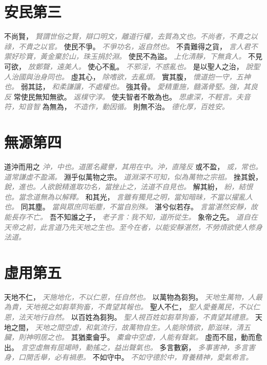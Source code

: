 \documentclass[a4paper,zihao=-4,oneside,landscape,UTF8]{ctexart}
\newcommand{\zhushi}[1]{\scriptsize{\textit{\textcolor{gray}{#1}}}\normalsize}
\begin{document}
\section{安民第三}

不尚賢，
\zhushi{賢謂世俗之賢，辯口明文，離道行權，去質為文也。不尚者，不貴之以祿，不貴之以官。}
使民不爭。
\zhushi{不爭功名，返自然也。}
不貴難得之貨，
\zhushi{言人君不禦好珍寶，黃金棄於山，珠玉捐於淵。}
使民不為盜。
\zhushi{上化清靜，下無貪人。}
不見可欲，
\zhushi{放鄭聲，遠美人。}
使心不亂。
\zhushi{不邪淫，不惑亂也。}
是以聖人之治，
\zhushi{說聖人治國與治身同也。}
虛其心，
\zhushi{除嗜欲，去亂煩。}
實其腹，
\zhushi{懷道抱一守，五神也。}
弱其誌，
\zhushi{和柔謙讓，不處權也。}
強其骨。
\zhushi{愛精重施，髓滿骨堅。強，其良反}
常使民無知無欲。
\zhushi{返樸守淳。}
使夫智者不敢為也。
\zhushi{思慮深，不輕言。夫音符，知音智}
為無為，
\zhushi{不造作，動因循。}
則無不治。
\zhushi{德化厚，百姓安。}


\section{無源第四}

道沖而用之
\zhushi{沖，中也。道匿名藏譽，其用在中。沖，直隆反}
或不盈，
\zhushi{或，常也。道常謙虛不盈滿。}
淵乎似萬物之宗。
\zhushi{道淵深不可知，似為萬物之宗祖。}
挫其銳，
\zhushi{銳，進也。人欲銳精進取功名，當挫止之，法道不自見也。}
解其紛，
\zhushi{紛，結恨也。當念道無為以解釋。}
和其光，
\zhushi{言雖有獨見之明，當知暗昧，不當以擢亂人也。}
同其塵。
\zhushi{當與眾庶同垢塵，不當自別殊。}
湛兮似若存。
\zhushi{言當湛然安靜，故能長存不亡。}
吾不知誰之子，
\zhushi{老子言：我不知，道所從生。}
象帝之先。
\zhushi{道自在天帝之前，此言道乃先天地之生也。至今在者，以能安靜湛然，不勞煩欲使人修身法道。}


\section{虛用第五}

天地不仁，
\zhushi{天施地化，不以仁恩，任自然也。}
以萬物為芻狗。
\zhushi{天地生萬物，人最為貴，天地視之如芻草狗畜，不貴望其報也。}
聖人不仁，
\zhushi{聖人愛養萬民，不以仁恩，法天地行自然。}
以百姓為芻狗。
\zhushi{聖人視百姓如芻草狗畜，不貴望其禮意。}
天地之間，
\zhushi{天地之間空虛，和氣流行，故萬物自生。人能除情欲，節滋味，清五臟，則神明居之也。}
其猶橐龠乎。
\zhushi{橐龠中空虛，人能有聲氣。}
虛而不屈，動而愈出。
\zhushi{言空虛無有屈竭時，動搖之，益出聲氣也。}
多言數窮，
\zhushi{多事害神，多言害身，口開舌舉，必有禍患。}
不如守中。
\zhushi{不如守德於中，育養精神，愛氣希言。}
\end{document}
